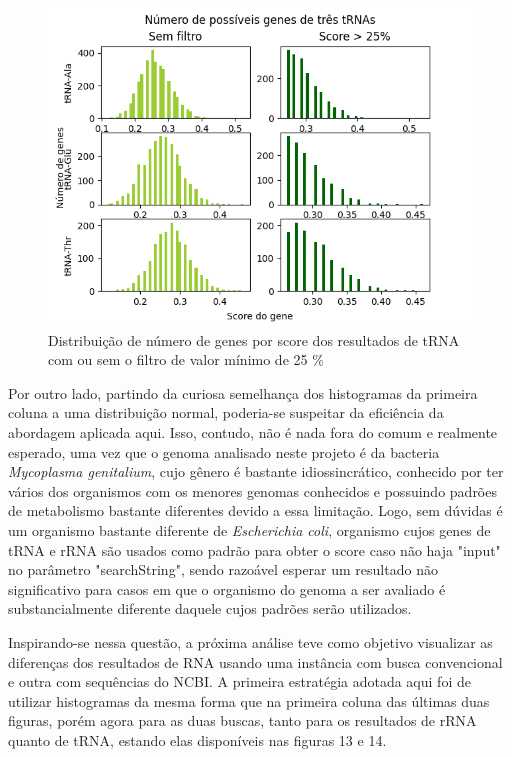 \documentclass[brazilian,12pt,a4paper,final]{article}
\begin{document}
\begin{figure}[hbtp]
	\begin{center}
		\includegraphics[width=15cm]{../Figures/genestRNA.png}
		\caption{Distribuição de número de genes por score dos resultados de tRNA com ou sem o filtro de valor mínimo de 25 \%}
		\label{fig}
	\end{center}
\end{figure}	
	
	 \vspace{0.5cm}
	
	 Por outro lado, partindo da curiosa semelhança dos histogramas da primeira coluna a uma distribuição normal, poderia-se suspeitar da eficiência da abordagem aplicada aqui. Isso, contudo, não é nada fora do comum e realmente esperado, uma vez que o genoma analisado neste projeto é da bacteria \textit{Mycoplasma genitalium}, cujo gênero é bastante idiossincrático, conhecido por ter vários dos organismos com os menores genomas conhecidos e possuindo padrões de metabolismo bastante diferentes devido a essa limitação. Logo, sem dúvidas é um organismo bastante diferente de \textit{Escherichia coli}, organismo cujos genes de tRNA e rRNA são usados como padrão para obter o score caso não haja "input" no parâmetro "searchString", sendo razoável esperar um resultado não significativo para casos em que o organismo do genoma a ser avaliado é substancialmente diferente daquele cujos padrões serão utilizados.
	 
	  \vspace{0.5cm}
	 
	
	Inspirando-se nessa questão, a próxima análise teve como objetivo visualizar as diferenças dos resultados de RNA usando uma instância com busca convencional e outra com sequências do NCBI. A primeira estratégia adotada aqui foi de utilizar histogramas da mesma forma que na primeira coluna das últimas duas figuras, porém agora para as duas buscas, tanto para os resultados de rRNA quanto de tRNA, estando elas disponíveis nas figuras 13 e 14.
	
\end{document}

